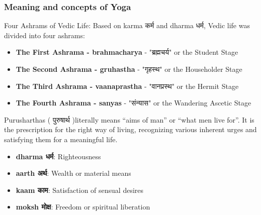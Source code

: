 


\begin{frame}[fragile]\frametitle{Meaning and concepts of Yoga}
Four Ashrams of Vedic Life: Based on karma कर्म and dharma धर्म, Vedic life was divided into four ashrams: 

          \begin{itemize}
            \item \textbf{The First Ashrama - brahmacharya } - "ब्रह्मचर्य" or the Student Stage
            \item \textbf{The Second Ashrama - gruhastha } - "गृहस्थ" or the Householder Stage
            \item \textbf{The Third Ashrama - vaanaprastha } - "वानप्रस्थ" or the Hermit Stage
            \item \textbf{The Fourth Ashrama - sanyas } - "संन्यास" or the Wandering Ascetic Stage
          \end{itemize}
		  
Purusharthas ( पुरुषार्थ )literally means ``aims of man'' or ``what men live for''. It is the prescription for the right way of living, recognizing various inherent urges and satisfying them for a meaningful life.
          
          \begin{itemize}
            \item \textbf{dharma धर्म}: Righteousness
            \item \textbf{aarth अर्थ}: Wealth or material means
            \item \textbf{kaam काम}: Satisfaction of sensual desires
            \item \textbf{moksh मोक्ष}: Freedom or spiritual liberation
          \end{itemize}
\end{frame}

